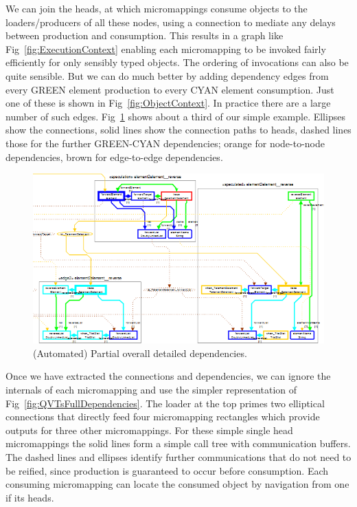 \documentclass{llncs}
\begin{document}
We can join the heads, at which micromappings consume objects to the loaders/producers of all these nodes, using a connection to mediate any delays between production and consumption. This results in a graph like Fig~\ref{fig:ExecutionContext} enabling each micromapping to be invoked fairly efficiently for only sensibly typed objects. The ordering of invocations can also be quite sensible. But we can do much better by adding dependency edges from every GREEN element production to every CYAN element consumption. Just one of these is shown in Fig~\ref{fig:ObjectContext}. In practice there are a large number of such edges. Fig~\ref{fig:QVTsPartialDependencies} shows about a third of our simple example. Ellipses show the connections, solid lines show the connection paths to heads, dashed lines those for the further GREEN-CYAN dependencies; orange for node-to-node dependencies, brown for edge-to-edge dependencies.

\begin{figure}[h]
	\centering
	\includegraphics[width=1.0\textwidth]{QVTsFullDependencies.png}
	\caption{(Automated) Partial overall detailed dependencies.}
	\label{fig:QVTsPartialDependencies}
\end{figure}

Once we have extracted the connections and dependencies, we can ignore the internals of each micromapping and use the simpler representation of Fig~\ref{fig:QVTsFullDependencies}. The loader at the top primes two elliptical connections that directly feed four micromapping rectangles which provide outputs for three other micromappings. For these simple single head micromappings the solid lines form a simple call tree with communication buffers. The dashed lines and ellipses identify further communications that do not need to be reified, since production is guaranteed to occur before consumption. Each consuming micromapping can locate the consumed object by navigation from one if its heads. 
\end{document}
